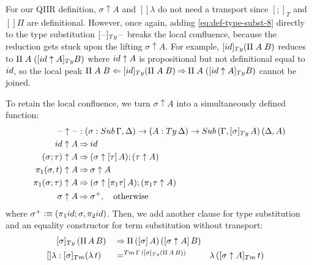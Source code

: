 \documentclass[a4paper,UKenglish,numberwithinsect,cleveref,thm-restate]{lipics-v2021}
\begin{document}
For our QIIR definition, $\sigma\uparrow A$ and $[]\lambda$ do not need a transport since $[;]_T$ and $[]\Pi$ are definitional.
However, once again, adding \eqref{eq:def-type-subst-8} directly to the type substitution $[\blank]_{\Ty}\blank$ breaks the local confluence, because the reduction gets stuck upon the lifting $\sigma \uparrow A$.
For example, $[\idS]_{\Ty}(\Pi\;A\;B)$ reduces to $\Pi\;A\;([\idS \uparrow A]_{\Ty}B)$ where $\idS \uparrow A$ is propositional but not definitional equal to $\idS$, so the local peak $\Pi\;A\;B \Leftarrow [\idS]_{\Ty}(\Pi\;A\;B) \reduce \Pi\;A\;([\idS \uparrow A]_{\Ty}B)$ cannot be joined. 

To retain the local confluence, we turn $\sigma \uparrow A$ into a simultaneously defined function:
\begin{alignat}{3}
  \blank\uparrow \blank & : (\sigma : \Sub\,\Gamma,\Delta) \to (A : \Ty\,\Delta) \to \Sub\,(\Gamma, [\sigma]_{\Ty}\,A)\, (\Delta, A) \label{eq:type-of-lifting} \\
\idS                \uparrow A & \reduce \idS \nonumber \\
(\sigma ; \tau)     \uparrow A & \reduce (\sigma \uparrow \sub{\tau}{A} ) ; (\tau \uparrow A) \nonumber \\
\pi_1(\sigma, t)    \uparrow A & \reduce \sigma \uparrow A \nonumber \\
\pi_1(\sigma; \tau) \uparrow A & \reduce (\sigma \uparrow \sub{\pi_1 \tau}{A}) ; (\pi_1 \tau \uparrow A)\nonumber \\
\sigma              \uparrow A & \reduce \sigma^+ , \quad \text{otherwise} \nonumber
\end{alignat}
where $\sigma^+ \defeq (\pi_1\idS ; \sigma, \pi_2\idS)$.
Then, we add another clause for type substitution and an equality constructor for term substitution without transport:
\begin{alignat}{5}
                     & [ \sigma ]_{\Ty}\,(\Pi\,A\,B) && \reduce \Pi\,(\sub{\sigma}{A})\,(\sub{\sigma\uparrow A}{B}) \label{eq:def-type-subst-9} \\
  \mathsf{[]\lambda} & : [\sigma]_{\Tm} (\lambda\,t) && =^{\Tm\,\Gamma\,([\sigma]_{\Ty}(\Pi\,A\,B))} && \lambda\,([\sigma \uparrow A]_{\Tm}\,t) \nonumber
\end{alignat}
\end{document}
